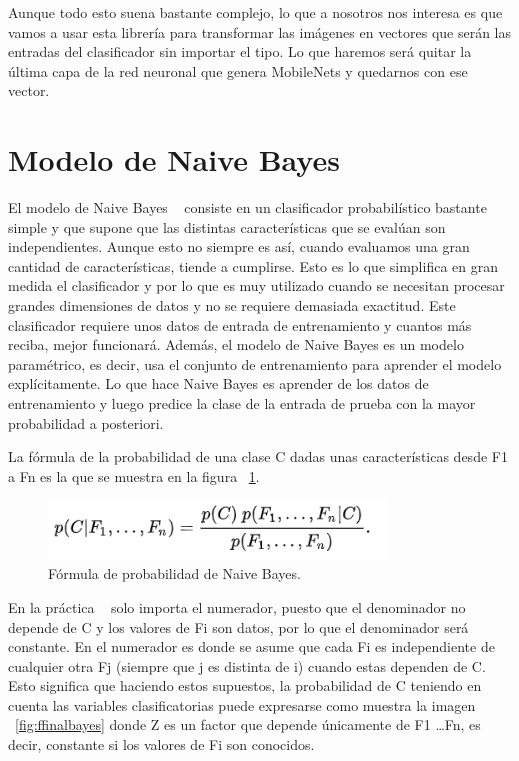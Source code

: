 \documentclass[a4paper, 12pt]{book}
\begin{document}
Aunque todo esto suena bastante complejo, lo que a nosotros nos interesa es que vamos a usar esta librería para transformar las imágenes en vectores que serán las entradas del clasificador sin importar el tipo. Lo que haremos será quitar la última capa de la red neuronal que genera MobileNets y quedarnos con ese vector.

\section{Modelo de Naive Bayes} 
\label{sec:modelobayes}

El modelo de Naive Bayes ~\cite{articulobayes} consiste en un clasificador probabilístico bastante simple y que supone que las distintas características que se evalúan son independientes. Aunque esto no siempre es así, cuando evaluamos una gran cantidad de características, tiende a cumplirse. Esto es lo que simplifica en gran medida el clasificador y por lo que es muy utilizado cuando se necesitan procesar grandes dimensiones de datos y no se requiere demasiada exactitud. Este clasificador requiere unos datos de entrada de entrenamiento y cuantos más reciba, mejor funcionará. Además, el modelo de Naive Bayes es un modelo paramétrico, es decir, usa el conjunto de entrenamiento para aprender el modelo explícitamente. Lo que hace Naive Bayes es aprender de los datos de entrenamiento y luego predice la clase de la entrada de prueba con la mayor probabilidad a posteriori.

La fórmula de la probabilidad de una clase C dadas unas características desde F1 a Fn es la que se muestra en la figura ~\ref{fig:formulabayes}.

\begin{figure}
	\centering
	\includegraphics[width=9cm, keepaspectratio]{img/formulabayes}
	\caption{Fórmula de probabilidad de Naive Bayes.}
	\label{fig:formulabayes}
\end{figure}

En la práctica ~\cite{machinelearning} solo importa el numerador, puesto que el denominador no depende de C y los valores de Fi son datos, por lo que el denominador será constante. En el numerador es donde se asume que cada Fi es independiente de cualquier otra Fj (siempre que j es distinta de i) cuando estas dependen de C. Esto significa que haciendo estos supuestos, la probabilidad de C teniendo en cuenta las variables clasificatorias puede expresarse como muestra la imagen ~\ref{fig:ffinalbayes} donde Z es un factor que depende únicamente de F1 \dots Fn, es decir, constante si los valores de Fi son conocidos.
\end{document}
